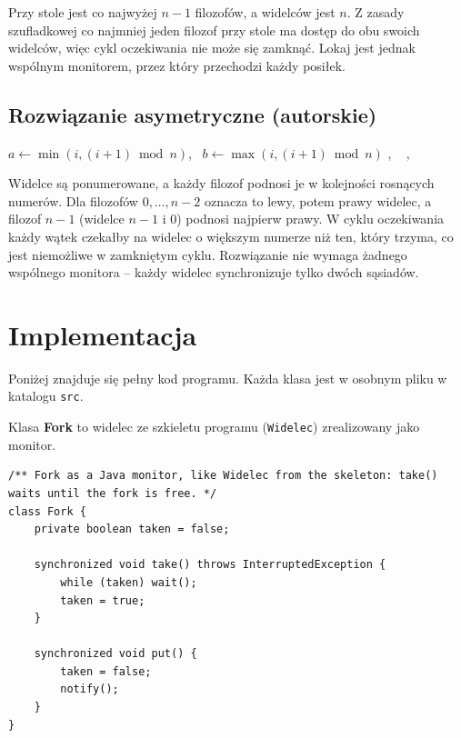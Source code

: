 \documentclass[11pt,a4paper]{article}
\newenvironment{algorytm}[1][htb]
  {\par\bigskip\floatname{algorithm}{}\renewcommand{\thealgorithm}{}
   \begin{algorithm}[#1]%
  }{\end{algorithm}\par\bigskip}
\begin{document}
Przy stole jest co najwyżej $n - 1$ filozofów, a widelców jest $n$. Z zasady szufladkowej
co najmniej jeden filozof przy stole ma dostęp do obu swoich widelców, więc cykl oczekiwania
nie może się zamknąć. Lokaj jest jednak wspólnym monitorem, przez który przechodzi każdy posiłek.

\subsection{Rozwiązanie asymetryczne (autorskie)}
\begin{algorytm}[H]
\begin{algorithmic}[1]
        \State $a \gets \min(i, (i + 1) \bmod n)$, \ $b \gets \max(i, (i + 1) \bmod n)$
        \State {}, \ 
    \EndProcedure
        \State {}, \ 
    \EndProcedure
\end{algorithmic}
\caption{Rozwiązanie asymetryczne (hierarchia zasobów)}
\end{algorytm}

Widelce są ponumerowane, a każdy filozof podnosi je w kolejności rosnących numerów.
Dla filozofów $0, \dots, n-2$ oznacza to lewy, potem prawy widelec, a filozof $n - 1$
(widelce $n - 1$ i $0$) podnosi najpierw prawy. W cyklu oczekiwania każdy wątek czekałby
na widelec o większym numerze niż ten, który trzyma, co jest niemożliwe w zamkniętym cyklu.
Rozwiązanie nie wymaga żadnego wspólnego monitora -- każdy widelec synchronizuje tylko
dwóch sąsiadów.

\pagebreak
\section{Implementacja}
Poniżej znajduje się pełny kod programu. Każda klasa jest w osobnym pliku w katalogu \texttt{src}.

Klasa \textbf{Fork} to widelec ze szkieletu programu (\texttt{Widelec}) zrealizowany jako monitor.

\begin{lstlisting}[caption={Klasa \textbf{Fork} (\texttt{src/Fork.java})}]
/** Fork as a Java monitor, like Widelec from the skeleton: take() waits until the fork is free. */
class Fork {
    private boolean taken = false;

    synchronized void take() throws InterruptedException {
        while (taken) wait();
        taken = true;
    }

    synchronized void put() {
        taken = false;
        notify();
    }
}
\end{lstlisting}
\end{document}
